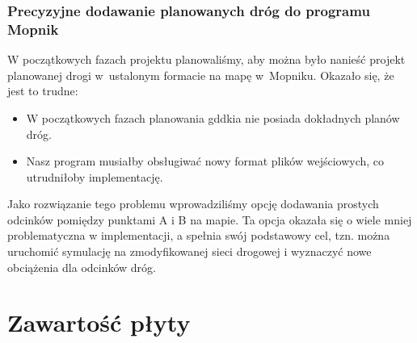\subsection{Precyzyjne dodawanie planowanych dróg do programu Mopnik}
W początkowych fazach projektu planowaliśmy, aby można było nanieść projekt planowanej drogi w~ustalonym formacie na mapę w~Mopniku. Okazało się, że jest to trudne:
\begin{itemize}
\item W początkowych fazach planowania \acrshort{gddkia} nie posiada dokładnych planów dróg.
\item Nasz program musiałby obsługiwać nowy format plików wejściowych, co utrudniłoby implementację.
\end{itemize}
Jako rozwiązanie tego problemu wprowadziliśmy opcję dodawania prostych odcinków pomiędzy punktami A i B na mapie. Ta opcja okazała się o wiele mniej problematyczna w implementacji, a spełnia swój podstawowy cel, tzn. można uruchomić symulację na zmodyfikowanej sieci drogowej i wyznaczyć nowe obciążenia dla odcinków dróg.

\chapter{Zawartość płyty}

